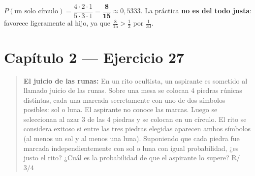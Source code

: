\documentclass[11pt]{article}
\begin{document}
\begin{resp}
$P(\text{un solo c\'irculo})=\dfrac{4\cdot 2\cdot 1}{5\cdot 3\cdot 1}=\mathbf{\dfrac{8}{15}}\approx 0{,}5333$. La pr\'actica \textbf{no es del todo justa}: favorece ligeramente al hijo, ya que $\tfrac{8}{15}>\tfrac12$ por $\tfrac{1}{30}$.
\end{resp}

\section*{Cap\'itulo 2 --- Ejercicio 27}

\begin{quote}
\textbf{El juicio de las runas:} En un rito ocultista, un aspirante es sometido al llamado juicio de las runas. Sobre una mesa se colocan 4 piedras r\'unicas distintas, cada una marcada secretamente con uno de dos s\'imbolos posibles: sol o luna. El aspirante no conoce las marcas. Luego se seleccionan al azar 3 de las 4 piedras y se colocan en un c\'irculo. El rito se considera exitoso si entre las tres piedras elegidas aparecen ambos s\'imbolos (al menos un sol y al menos una luna). Suponiendo que cada piedra fue marcada independientemente con sol o luna con igual probabilidad, ¿es justo el rito? ¿Cu\'al es la probabilidad de que el aspirante lo supere? \hfill R/ $3/4$
\end{quote}
\end{document}
